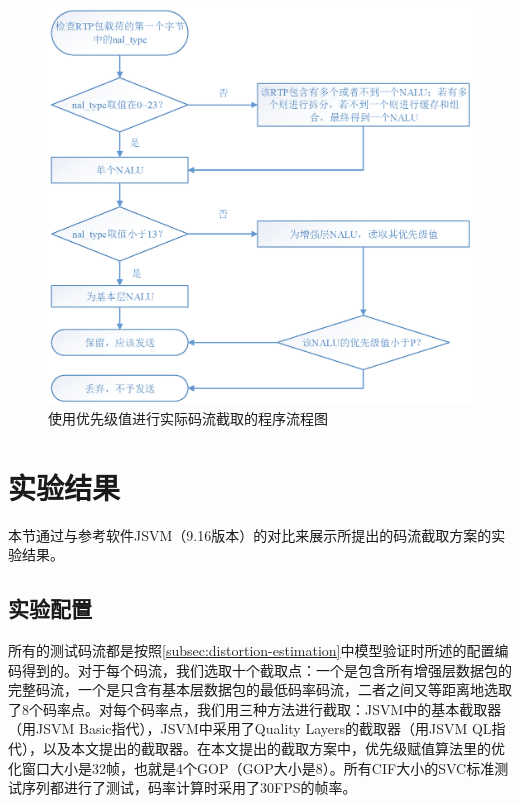\begin{figure}[!ht]
	\centering
	\includegraphics[width = 1.0\linewidth]{eps/extraction-flow}
	\caption{使用优先级值进行实际码流截取的程序流程图\label{fig:extraction-flow}}
\end{figure}

\section{实验结果}

本节通过与参考软件JSVM（9.16版本）的对比来展示所提出的码流截取方案的实验结果。

\subsection{实验配置}

所有的测试码流都是按照\ref{subsec:distortion-estimation}中模型验证时所述的配置编码得到的。对于每个码流，我们选取十个截取点：一个是包含所有增强层数据包的完整码流，一个是只含有基本层数据包的最低码率码流，二者之间又等距离地选取了8个码率点。对每个码率点，我们用三种方法进行截取：JSVM中的基本截取器（用JSVM Basic指代），JSVM中采用了Quality Layers的截取器（用JSVM QL指代），以及本文提出的截取器。在本文提出的截取方案中，优先级赋值算法里的优化窗口大小是32帧，也就是4个GOP（GOP大小是8）。所有CIF大小的SVC标准测试序列都进行了测试，码率计算时采用了30FPS的帧率。

